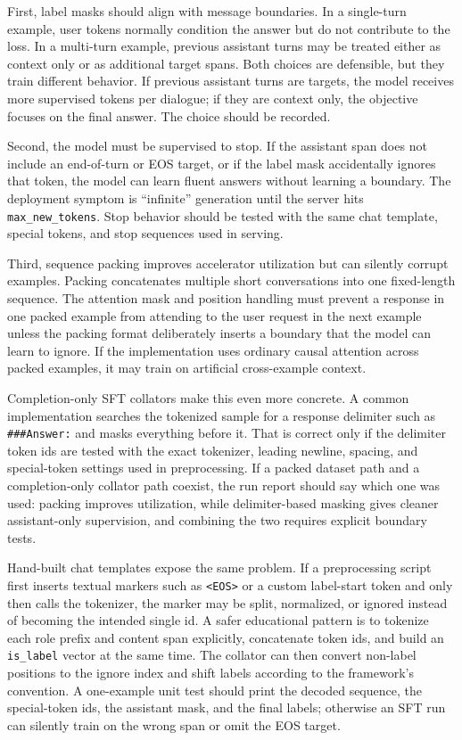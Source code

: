 First, label masks should align with message boundaries. In a single-turn example, user tokens normally condition the answer but do not contribute to the loss. In a multi-turn example, previous assistant turns may be treated either as context only or as additional target spans. Both choices are defensible, but they train different behavior. If previous assistant turns are targets, the model receives more supervised tokens per dialogue; if they are context only, the objective focuses on the final answer. The choice should be recorded.

Second, the model must be supervised to stop. If the assistant span does not include an end-of-turn or EOS target, or if the label mask accidentally ignores that token, the model can learn fluent answers without learning a boundary. The deployment symptom is ``infinite'' generation until the server hits \texttt{max\_new\_tokens}. Stop behavior should be tested with the same chat template, special tokens, and stop sequences used in serving.

Third, sequence packing improves accelerator utilization but can silently corrupt examples. Packing concatenates multiple short conversations into one fixed-length sequence. The attention mask and position handling must prevent a response in one packed example from attending to the user request in the next example unless the packing format deliberately inserts a boundary that the model can learn to ignore. If the implementation uses ordinary causal attention across packed examples, it may train on artificial cross-example context.

Completion-only SFT collators make this even more concrete. A common implementation searches the tokenized sample for a response delimiter such as \texttt{\#\#\#Answer:} and masks everything before it. That is correct only if the delimiter token ids are tested with the exact tokenizer, leading newline, spacing, and special-token settings used in preprocessing. If a packed dataset path and a completion-only collator path coexist, the run report should say which one was used: packing improves utilization, while delimiter-based masking gives cleaner assistant-only supervision, and combining the two requires explicit boundary tests.

Hand-built chat templates expose the same problem. If a preprocessing script first inserts textual markers such as \texttt{<EOS>} or a custom label-start token and only then calls the tokenizer, the marker may be split, normalized, or ignored instead of becoming the intended single id. A safer educational pattern is to tokenize each role prefix and content span explicitly, concatenate token ids, and build an \texttt{is\_label} vector at the same time. The collator can then convert non-label positions to the ignore index and shift labels according to the framework's convention. A one-example unit test should print the decoded sequence, the special-token ids, the assistant mask, and the final labels; otherwise an SFT run can silently train on the wrong span or omit the EOS target.


